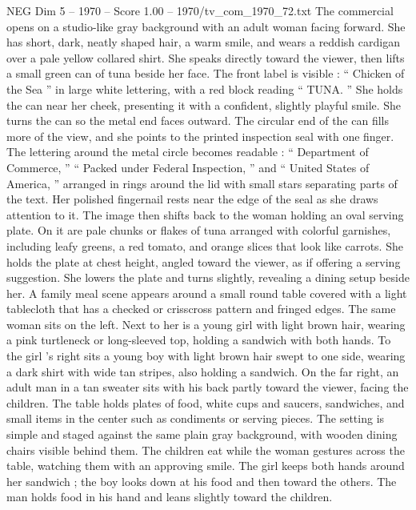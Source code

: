 \begin{textsample}{NEG Dim 5 – 1970 – Score 1.00 – 1970/tv\_com\_1970\_72.txt}  \label{ex:f5_neg_017}
The commercial opens on a studio-like gray background with an adult woman facing forward.
She has short, dark, neatly shaped hair, a warm smile, and wears a reddish cardigan over a pale yellow collared shirt.
She speaks directly toward the viewer, then lifts a small green can of tuna beside her face.
The front label is visible : “ Chicken of the Sea ” in large white lettering, with a red block reading “ TUNA. ” She holds the can near her cheek, presenting it with a confident, slightly playful smile.
She turns the can so the metal end faces outward.
The circular end of the can fills more of the view, and she points to the printed inspection seal with one finger.
The lettering around the metal circle becomes readable : “ Department of Commerce, ” “ Packed under Federal Inspection, ” and “ United States of America, ” arranged in rings around the lid with small stars separating parts of the text.
Her polished fingernail rests near the edge of the seal as she draws attention to it.
The image then shifts back to the woman holding an oval serving plate.
On it are pale chunks or flakes of tuna arranged with colorful garnishes, including leafy greens, a red tomato, and orange slices that look like carrots.
She holds the plate at chest height, angled toward the viewer, as if offering a serving suggestion.
She lowers the plate and turns slightly, revealing a dining setup beside her.
A family meal scene appears around a small round table covered with a light tablecloth that has a checked or crisscross pattern and fringed edges.
The same woman sits on the left.
Next to her is a young girl with light brown hair, wearing a pink turtleneck or long-sleeved top, holding a sandwich with both hands.
To the girl ’s right sits a young boy with light brown hair swept to one side, wearing a dark shirt with wide tan stripes, also holding a sandwich.
On the far right, an adult man in a tan sweater sits with his back partly toward the viewer, facing the children.
The table holds plates of food, white cups and saucers, sandwiches, and small items in the center such as condiments or serving pieces.
The setting is simple and staged against the same plain gray background, with wooden dining chairs visible behind them.
The children eat while the woman gestures across the table, watching them with an approving smile.
The girl keeps both hands around her sandwich ; the boy looks down at his food and then toward the others.
The man holds food in his hand and leans slightly toward the children.

\end{textsample}
